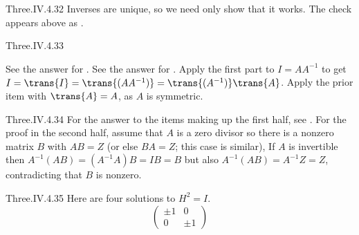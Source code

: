 \begin{ans}{Three.IV.4.32}
      Inverses are unique, so we need only show that it works.
      The check appears above as
      .
    
\end{ans}
\begin{ans}{Three.IV.4.33}
      \begin{exparts}
        \partsitem See the answer for .
        \partsitem See the answer for .
        \partsitem Apply the first part to
          \( I=AA^{-1} \) to get
          $I=\trans{I}=\trans{(AA^{-1})}=\trans{(A^{-1})}\trans{A}$.
        \partsitem Apply the prior item with \( \trans{A}=A \),
          as \( A \) is symmetric.
      \end{exparts}
    
\end{ans}
\begin{ans}{Three.IV.4.34}
      For the answer to the items making up the first half, see
      .
      For the proof in the second half, assume that $A$ is a zero divisor so
      there is a nonzero matrix $B$ with $AB=Z$
      (or else $BA=Z$; this case is similar),
      If $A$ is invertible
      then $A^{-1}(AB)=(A^{-1}A)B=IB=B$ but also
      $A^{-1}(AB)=A^{-1}Z=Z$, contradicting that $B$ is nonzero.
    
\end{ans}
\begin{ans}{Three.IV.4.35}
      Here are four solutions to \( H^2=I \).
      \begin{equation*}
        \begin{pmatrix}
          \pm 1  &0  \\
          0      &\pm 1
        \end{pmatrix}
      \end{equation*}
    
\end{ans}
